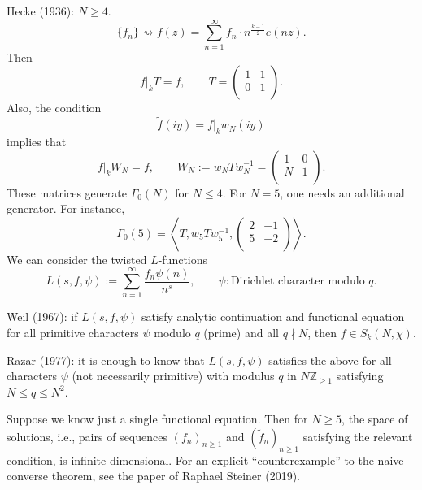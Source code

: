 \documentclass[reqno]{amsart} 
\begin{document}
Hecke (1936): $N \geq 4$.
\begin{equation*}
  \{f_n\}
  \rightsquigarrow 
  f(z) = \sum_{n = 1 }^\infty
  f_n \cdot n^{\frac{k - 1 }{2}} e (n z).
\end{equation*}
Then
\begin{equation*}
  f |_k T = f,
  \qquad
  T =
  \begin{pmatrix}
    1 & 1 \\
    0 & 1 \\
  \end{pmatrix}.
\end{equation*}
Also, the condition
\begin{equation*}
  \tilde{f} (i y ) = f |_k w_N (i y)
\end{equation*}
implies that
\begin{equation*}
  f|_k W_N = f,
  \qquad
  W_N :=
  w_N T w_N^{-1} =
  \begin{pmatrix}
    1 & 0 \\
    N & 1 \\
  \end{pmatrix}.
\end{equation*}
These matrices generate $\Gamma_0 (N)$ for $N \leq 4$.  For $N = 5$, one needs an additional generator.  For instance,
\begin{equation*}
  \Gamma_0(5)
  = \left\langle T, w_5 T w_5^{-1},
    \begin{pmatrix}
      2 & -1 \\
      5 & -2 \\
    \end{pmatrix} \right\rangle.
\end{equation*}
We can consider the twisted $L$-functions
\begin{equation*}
  L (s, f, \psi ) := \sum_{n = 1}^\infty
  \frac{f_n \psi (n)}{ n^s },
  \qquad
  \psi : \text{Dirichlet character modulo } q.
\end{equation*}

Weil (1967): if $L (s, f, \psi )$ satisfy analytic continuation and functional equation for all primitive characters $\psi$ modulo $q$ (prime) and all $q \nmid N$, then $f \in S_k(N,\chi)$.

Razar (1977): it is enough to know that $L (s, f, \psi )$ satisfies the above for all characters $\psi$ (not necessarily primitive) with modulus $q$ in $N \mathbb{Z}_{\geq 1}$ satisfying $N \leq q \leq N^2$.

Suppose we know just a single functional equation.  Then for $N \geq 5$, the space of solutions, i.e., pairs of sequences $(f_n)_{n \geq 1}$ and $(\tilde{f}_n)_{n \geq 1}$ satisfying the relevant condition, is infinite-dimensional.  For an explicit ``counterexample'' to the naive converse theorem, see the paper of Raphael Steiner (2019).
\end{document}
